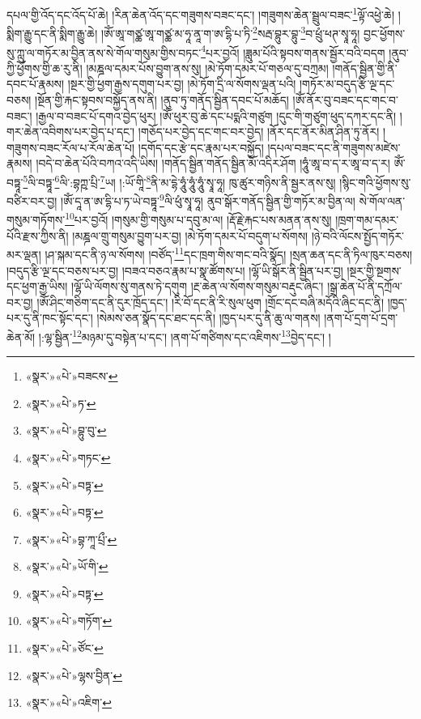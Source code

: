 དཔལ་གྱི་འོད་དང་འོད་པོ་ཆེ། །རིན་ཆེན་འོད་དང་གཟུགས་བཟང་དང་། །གཟུགས་ཆེན་སྦྲུལ་བཟང་\footnote{«སྣར་»«པེ་»བཟངས་}ལྟོ་འཕྱེ་ཆེ། །སྨིག་རྒྱུ་དང་ནི་སྨིག་རྒྱུ་ཆེ། །ཨོཾ་ཨཱ་གཙྪ་ཨཱ་གཙྪ་མ་ཧཱ་ནཱ་ག་ཨ་དྷི་པ་ཏི་\footnote{«སྣར་»«པེ་»ཏ་}སརྦ་བྷུར་བྷུ་\footnote{«སྣར་»«པེ་»བྷུ་བུ་}བ་ཕྲུཾ་ཕཊ་སྭཱ་ཧཱ། བྱང་ཕྱོགས་སུ་ཀླུ་ལ་གཏོར་མ་བྱིན་ནས་སེ་གོལ་གསུམ་གྱིས་བཏང་\footnote{«སྣར་»«པེ་»གཏང་}པར་བྱའོ། །ཟླུམ་པོའི་སྟབས་གནས་སྦྱོར་བའི་བདག །ནུབ་ཀྱི་ཕྱོགས་གྱི་ཆ་རུ་ནི། །མཎྜལ་དམར་པོས་བྱུག་ནས་སུ། །མེ་ཏོག་དམར་པོ་གཅལ་དུ་བཀྲམ། །གནོད་སྦྱིན་གྱི་ནི་དབང་པོ་རྣམས། །སྔར་གྱི་ཕྱག་རྒྱས་དགུག་པར་བྱ། །མེ་ཏོག་དྲི་ལ་སོགས་ལྡན་པའི། །གཏོར་མ་བདུད་རྩི་ལྔ་དང་བཅས། །སྔོན་གྱི་རྐང་སྟབས་བསྐྱོད་ནས་ནི། །ནུབ་ཏུ་གནོད་སྦྱིན་དབང་པོ་མཆོད། །ཨོཾ་ནོར་བུ་བཟང་དང་གང་བ་བཟང་། །རྒྱལ་བ་བཟང་པོ་དགའ་བྱེད་ཕུར། །ཨོཾ་ཕུར་བུ་ཆེ་དང་པདྨའི་གཙུག །དུང་གི་གཙུག་ཕུད་དཀར་དང་ནི། །གར་ཆེན་འབིགས་པར་བྱེད་པ་དང་། །གཅོད་པར་བྱེད་དང་གང་བར་བྱེད། །ནོར་དང་ནོར་མིན་ཤིན་ཏུ་ནོར། །གཟུགས་བཟང་རོལ་པ་རོལ་ཆེན་པོ། །དགོད་དང་རྩེ་དང་རྣམ་པར་བསྐྱོད། །དཔལ་བཟང་དང་ནི་གཟུགས་མཛེས་རྣམས། །བདེ་བ་ཆེན་པོའི་བཀའ་འདི་ཡིས། །གནོད་སྦྱིན་གནོད་སྦྱིན་མོ་འདིར་ཤོག །ཧཱུཾ་ཨཱ་བ་ད་ར་ཨཱ་བ་ད་ར། ཨོཾ་བཏྟཱ་\footnote{«སྣར་»«པེ་»བཏྟ་}ལི་བཏྟཱ་\footnote{«སྣར་»«པེ་»བཏྟ་}ལི་:བྷཀྵ་པྲི་\footnote{«སྣར་»«པེ་»བྷ་ཀཱ་པྲྀ་}ཡ། །:ཡོ་གཱི་\footnote{«སྣར་»«པེ་»ཡོ་གི་}ནི་མ་དྷེ་ཧཱུཾ་ཧཱུཾ་ཧཱུཾ་སྭཱ་ཧཱ། ཁུ་ཚུར་གཉིས་ནི་སྦྱར་ནས་སུ། །སྙིང་གའི་ཕྱོགས་སུ་བཙིར་བར་བྱ། །ཨོཾ་དཱ་ན་ཨ་དྷི་པ་ཏ་ཡེ་བཏྟཱ་\footnote{«སྣར་»«པེ་»བཏྟ་}ལི་ཕུཾ་སྭཱ་ཧཱ། ནུབ་སྒོར་གནོད་སྦྱིན་གྱི་གཏོར་མ་བྱིན་ལ། སེ་གོལ་ལན་གསུམ་གཏོགས་\footnote{«སྣར་»«པེ་»གཏོག་}པར་བྱའོ། །གསུམ་གྱི་གསུམ་པ་དབུ་མ་ལ། །རྡོ་རྗེ་རྐང་པས་མནན་ནས་སུ། །ཁྲག་གམ་དམར་པོའི་རྫས་ཀྱིས་ནི། །མཎྜལ་གྲུ་གསུམ་བྱུག་པར་བྱ། །མེ་ཏོག་དམར་པོ་བདུག་པ་སོགས། །ཉེ་བའི་ལོངས་སྤྱོད་གཏོར་མར་ལྡན། །ཤ་སྐམ་དང་ནི་ཉ་ལ་སོགས། །བཙོད་\footnote{«སྣར་»«པེ་»ཙོང་}དང་ཁྲག་གིས་གང་བའི་སྣོད། །སྲན་ཆན་དང་ནི་ཏིལ་ཁུར་བཅས། །བདུད་རྩི་ལྔ་དང་བཅས་པར་བྱ། །བཟའ་བཅའ་རྣམ་པ་སྣ་ཚོགས་པ། །ལྷོ་ཡི་སྒོར་ནི་སྦྱིན་པར་བྱ། །སྔར་གྱི་སྔགས་དང་ཕྱག་རྒྱ་ཡིས། །ལྷོ་ཡི་ལོགས་སུ་གནས་ཏེ་དགུག །རྔ་ཆེན་ལ་སོགས་གསུམ་བརྡུང་ཞིང་། །སྒྲ་ཆེན་པོ་ནི་དཀྲོལ་བར་བྱ། །ཨོཾ་ཤིང་གཅིག་དང་ནི་དུར་ཁྲོད་དང་། །རི་བོ་དང་ནི་རི་སུལ་ཕུག །གྲོང་དང་བཞི་མདོའི་ཞིང་དང་ནི། །ཁྱད་པར་དུ་ནི་ཁང་སྟོང་དང་། །སེམས་ཅན་སྣོད་དང་ཐང་དང་ནི། །ཁྱད་པར་དུ་ནི་ཆུ་ལ་གནས། །ནག་པོ་དྲག་པོ་དྲག་ཆེན་མོ། །:ལྷ་སྦྱིན་\footnote{«སྣར་»«པེ་»ལྷས་བྱིན་}མཉམ་དུ་བསྟེན་པ་དང་། །ནག་པོ་གཙིགས་དང་འཇིགས་\footnote{«སྣར་»«པེ་»འཇིག་}བྱེད་དང་། །
